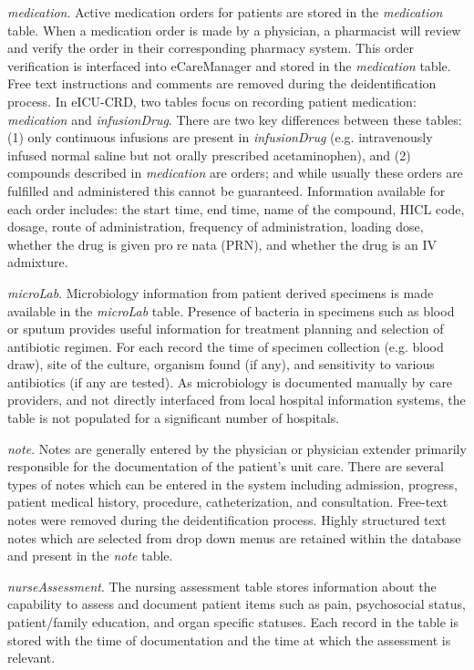 \documentclass[english]{article}
\newcommand{\tblname}[1]{\emph{#1}}
\begin{document}
\tblname{medication}. Active medication orders for patients are stored in the \tblname{medication} table.
When a medication order is made by a physician, a pharmacist will review and verify the order in their corresponding pharmacy system. This order verification is interfaced into eCareManager and stored in the \tblname{medication} table. Free text instructions and comments are removed during the deidentification process.
In eICU-CRD, two tables focus on recording patient medication: \tblname{medication} and \tblname{infusionDrug}.
There are two key differences between these tables: (1) only continuous infusions are present in \tblname{infusionDrug} (e.g. intravenously infused normal saline but not orally prescribed acetaminophen), and (2) compounds described in \tblname{medication} are orders; and while usually these orders are fulfilled and administered this cannot be guaranteed. Information available for each order includes: the start time, end time, name of the compound, HICL code, dosage, route of administration, frequency of administration, loading dose, whether the drug is given pro re nata (PRN), and whether the drug is an IV admixture.

\tblname{microLab}. Microbiology information from patient derived specimens is made available in the \tblname{microLab} table. Presence of bacteria in specimens such as blood or sputum provides useful information for treatment planning and selection of antibiotic regimen. For each record the time of specimen collection (e.g. blood draw), site of the culture, organism found (if any), and sensitivity to various antibiotics (if any are tested).
As microbiology is documented manually by care providers, and not directly interfaced from local hospital information systems, the table is not populated for a significant number of hospitals.

\tblname{note}. Notes are generally entered by the physician or physician extender primarily responsible for the documentation of the patient's unit care. There are several types of notes which can be entered in the system including admission, progress, patient medical history, procedure, catheterization, and consultation. Free-text notes were removed during the deidentification process. Highly structured text notes which are selected from drop down menus are retained within the database and present in the \tblname{note} table.

\tblname{nurseAssessment}. The nursing assessment table stores information about the capability to assess and document patient items such as pain, psychosocial status, patient/family education, and organ specific statuses. Each record in the table is stored with the time of documentation and the time at which the assessment is relevant.
\end{document}
